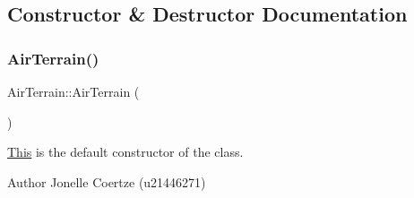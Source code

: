 \subsection{Constructor \& Destructor Documentation}
\mbox{\label{class_air_terrain_a360ac3a742f9d2155aad310cc6fa093f}} 
\subsubsection{\texorpdfstring{AirTerrain()}{AirTerrain()}}
{\footnotesize\ttfamily Air\+Terrain\+::\+Air\+Terrain (\begin{DoxyParamCaption}{ }\end{DoxyParamCaption})}



\mbox{\hyperlink{class_this}{This}} is the default constructor of the class. 

\begin{DoxyAuthor}{Author}
Jonelle Coertze (u21446271) 
\end{DoxyAuthor}
